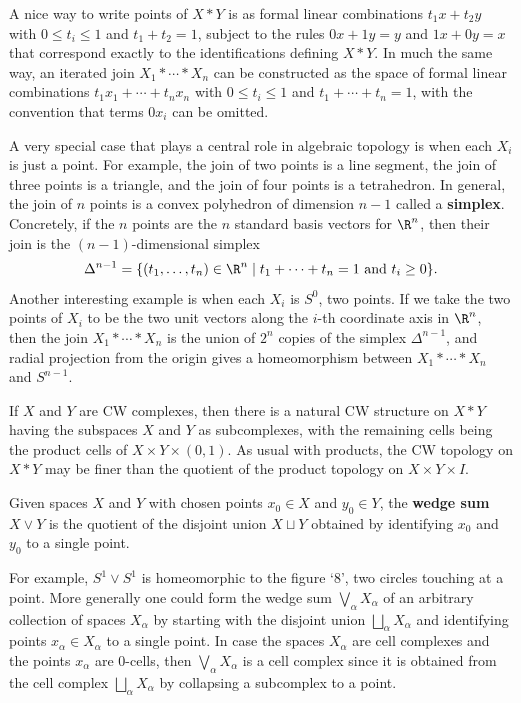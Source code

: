A nice way to write points of $X * Y$ is as formal linear combinations
$t_1 x + t_2 y$ with $0 \le t_i \le 1$ and $t_1 + t_2 = 1$, subject to the rules $0x + 1y = y$
and $1x + 0y = x$ that correspond exactly to the identifications defining $X * Y$. In
much the same way, an iterated join $X_1 * \cdots * X_n$ can be constructed as the space
of formal linear combinations $t_1 x_1 + \cdots + t_n x_n$ with $0 \le t_i \le 1$ and
$t_1 + \cdots + t_n = 1$, with the convention that terms $0 x_i$ can be omitted.

\begin{definition}[Simplex]
\label{def:simplex}
A very special case that plays a central role in algebraic topology is when each
$X_i$ is just a point. For example, the join of two points is a line segment, the join of
three points is a triangle, and the join of four points is a tetrahedron. In general, the
join of $n$ points is a convex polyhedron of dimension $n-1$ called a \textbf{simplex}.
Concretely, if the $n$ points are the $n$ standard basis vectors for $\R^n$, then their join
is the $(n-1)$-dimensional simplex
\[
\Delta^{n-1} = \{(t_1,\ldots,t_n) \in \R^n \mid t_1 + \cdots + t_n = 1 \text{ and } t_i \ge 0\}.
\]
Another interesting example is when each $X_i$ is $S^0$, two points. If we take the
two points of $X_i$ to be the two unit vectors along the $i$-th coordinate axis in $\R^n$,
then the join $X_1 * \cdots * X_n$ is the union of $2^n$ copies of the simplex $\Delta^{n-1}$, and
radial projection from the origin gives a homeomorphism between $X_1 * \cdots * X_n$
and $S^{n-1}$.
\end{definition}

If $X$ and $Y$ are CW complexes, then there is a natural CW structure on $X * Y$
having the subspaces $X$ and $Y$ as subcomplexes, with the remaining cells being the
product cells of $X \times Y \times (0,1)$. As usual with products, the CW topology on
$X * Y$ may be finer than the quotient of the product topology on $X \times Y \times I$.

\begin{definition}
\label{def:wedge-sum}
Given spaces $X$ and $Y$ with chosen points $x_0 \in X$ and $y_0 \in Y$, the
\textbf{wedge sum} $X \vee Y$ is the quotient of the disjoint union $X \sqcup Y$ obtained by
identifying $x_0$ and $y_0$ to a single point.
\end{definition}

For example, $S^1 \vee S^1$ is homeomorphic to the figure `8', two circles touching
at a point. More generally one could form the wedge sum $\bigvee_\alpha X_\alpha$ of an arbitrary
collection of spaces $X_\alpha$ by starting with the disjoint union $\bigsqcup_\alpha X_\alpha$ and
identifying points $x_\alpha \in X_\alpha$ to a single point. In case the spaces $X_\alpha$ are cell
complexes and the points $x_\alpha$ are 0-cells, then $\bigvee_\alpha X_\alpha$ is a cell complex since it
is obtained from the cell complex $\bigsqcup_\alpha X_\alpha$ by collapsing a subcomplex to a point.

